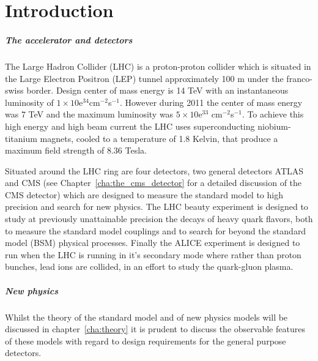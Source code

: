 \chapter{Introduction} %
\label{cha:introduction}
\paragraph{The accelerator and detectors} %
\label{par:the_accelerator_and_detectors}
The Large Hadron Collider (LHC) \cite{Benedikt:823808} is a proton-proton collider which is situated in the Large Electron Positron
(LEP) tunnel approximately 100 m under the franco-swiss border. Design center of mass energy is 14 TeV with an instantaneous
luminosity of $ 1 \times 10$e$^{34}$cm$^{-2}$s$^{-1}$. However during 2011 the center of mass energy was 7 TeV and the maximum
luminosity was $ 5 \times 10$e$^{33}$ cm$^{-2}$s$^{-1}$.
To achieve this high energy and high beam current the LHC uses superconducting niobium-titanium magnets, cooled to a temperature of 
1.8 Kelvin, that produce a maximum field strength of 8.36 Tesla.


Situated around the LHC ring are four detectors, two general detectors ATLAS \cite{Akesson:1999uv} and CMS (see
Chapter~\ref{cha:the_cms_detector} for a detailed discussion of the CMS detector) \cite{Friedl:1140134}\cite{Wulz:vf} which are  designed to measure the standard model to high precision and search for new physics. The LHC beauty experiment 
\cite{Rademacker:2005tx} is designed to study at previously unattainable precision the decays of heavy quark 
flavors, both to measure the standard model couplings and to search for beyond the standard model (BSM) physical processes. Finally
the ALICE \cite{Alessandro:2006ht} experiment is designed to run when the LHC is running in it's secondary mode where rather than
proton bunches, lead ions are collided, in an effort to study the quark-gluon plasma.




\paragraph{New physics} %
\label{par:new_physics}
Whilst the theory of the standard model and of new physics models will be discussed in chapter~\ref{cha:theory} it is prudent to 
discuss the observable features of these models with regard to design requirements for the general purpose detectors.
